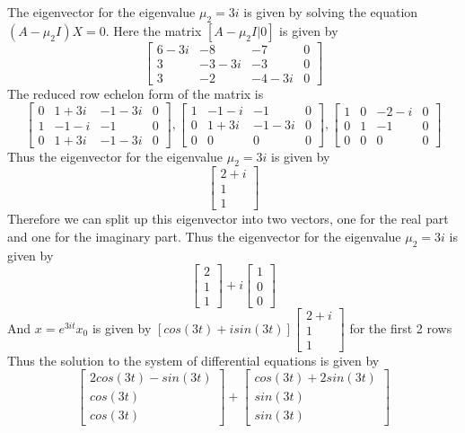 \documentclass{article}
\begin{document}
The eigenvector for the eigenvalue $\mu_2 = 3i$ is given by solving the equation $(A - \mu_2 I)X = 0$. Here the matrix $[A - \mu_2 I | 0]$ is given by
$$\begin{bmatrix}
    6 - 3i & -8 & -7 & 0\\
    3 & -3 - 3i & -3 & 0\\
    3 & -2 & -4 - 3i & 0
\end{bmatrix} $$
The reduced row echelon form of the matrix is
$$\begin{bmatrix}
    0 & 1+3i & -1-3i & 0\\
    1 & -1-i & -1 & 0\\
    0 & 1+3i & -1-3i & 0
\end{bmatrix}, \begin{bmatrix}
    1 & -1-i & -1 & 0\\
    0 & 1+3i & -1-3i & 0\\
    0 & 0 & 0 & 0
\end{bmatrix}, \begin{bmatrix}
    1 & 0 & -2-i & 0\\
    0 & 1 & -1 & 0\\
    0 & 0 & 0 & 0
\end{bmatrix}$$
Thus the eigenvector for the eigenvalue $\mu_2 = 3i$ is given by
$$\begin{bmatrix}
    2+i\\
    1\\
    1
\end{bmatrix} $$
Therefore we can split up this eigenvector into two vectors, one for the real part and one for the imaginary part. Thus the eigenvector for the eigenvalue $\mu_2 = 3i$ is given by
$$\begin{bmatrix}
    2\\
    1\\
    1
\end{bmatrix} + i\begin{bmatrix}
    1\\
    0\\
    0
\end{bmatrix} $$
And $x=e^{3it}x_0$ is given by $[cos(3t) + isin(3t)]\begin{bmatrix}
    2 +i \\
    1\\
    1
\end{bmatrix} $ for the first 2 rows \\
Thus the solution to the system of differential equations is given by
$$\begin{bmatrix}
    2cos(3t) - sin(3t)\\
    cos(3t)\\
    cos(3t)
\end{bmatrix} + \begin{bmatrix}
    cos(3t)+2sin(3t)\\
    sin(3t)\\
    sin(3t)
\end{bmatrix}$$
\end{document}
